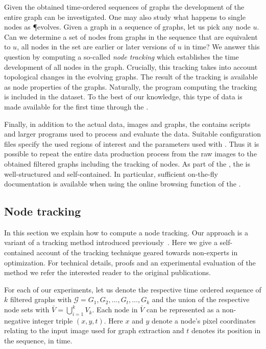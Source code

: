 	Given the obtained time-ordered sequences of graphs the development of the entire graph can be investigated. One may also study what happens to single nodes as \P evolves. Given a graph in a sequence of graphs, let us pick any node $u$. Can we determine a set of nodes from graphs in the sequence that are equivalent to $u$, \ie all nodes in the set are earlier or later versions of $u$ in time? We answer this question by computing a so-called \emph{node tracking} which establishes the time development of all nodes in the graph. Crucially, this tracking takes into account topological changes in the evolving graphs. The result of the tracking is available as node properties of the graphs. Naturally, the program computing the tracking is included in the dataset. To the best of our knowledge, this type of data is made available for the first time through the \data.

	Finally, in addition to the actual data, \ie images and graphs, the \data contains scripts and larger programs used to process and evaluate the data. Suitable configuration files specify the used regions of interest and the parameters used with \NEFI. Thus it is possible to repeat the entire data production process from the raw images to the obtained filtered graphs including the tracking of nodes. As part of the \SMGR, the \data is well-structured and self-contained. In particular, sufficient on-the-fly documentation is available when using the online browsing function of the \SMGR.

	\subsection{Node tracking}

		In this section we explain how to compute a node tracking. Our approach is a variant of a tracking method introduced previously~\cite{woll2013novel,Karrenbauer2013}. Here we give a self-contained account of the tracking technique geared towards non-experts in optimization. For technical details, proofs and an experimental evaluation of the method we refer the interested reader to the original publications.

		For each of our experiments, let us denote the respective time ordered sequence of $k$ filtered graphs with $\mathcal{G} = {G_1, G_2, \dots, G_t, \dots, G_k}$ and the union of the respective node sets with $\bar{V} = \bigcup_{i=1}^{k} V_{k}$. Each node in $\bar{V}$ can be represented as a non-negative integer triple $(x,y,t)$. Here $x$ and $y$ denote a node's pixel coordinates relating to the input image used for graph extraction and $t$ denotes its position in the sequence, \ie in time.

